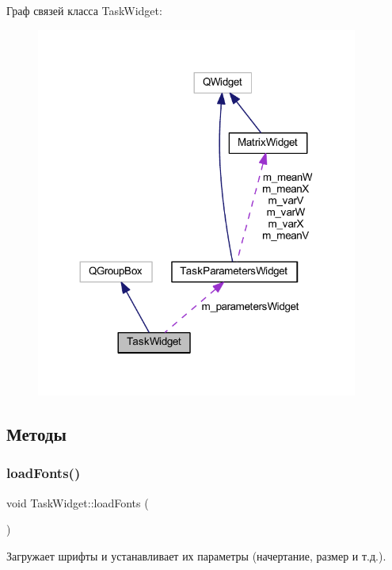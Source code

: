 Граф связей класса Task\+Widget\+:
\nopagebreak
\begin{figure}[H]
\begin{center}
\leavevmode
\includegraphics[width=300pt]{class_task_widget__coll__graph}
\end{center}
\end{figure}


\subsection{Методы}
\hypertarget{class_task_widget_a941ea41fcf94ff21f2b28e1ad61c8f02}{}\label{class_task_widget_a941ea41fcf94ff21f2b28e1ad61c8f02} 
\subsubsection{\texorpdfstring{load\+Fonts()}{loadFonts()}}
{\footnotesize\ttfamily void Task\+Widget\+::load\+Fonts (\begin{DoxyParamCaption}{ }\end{DoxyParamCaption})\hspace{0.3cm}{\ttfamily [private]}}



Загружает шрифты и устанавливает их параметры (начертание, размер и т.\+д.). 

